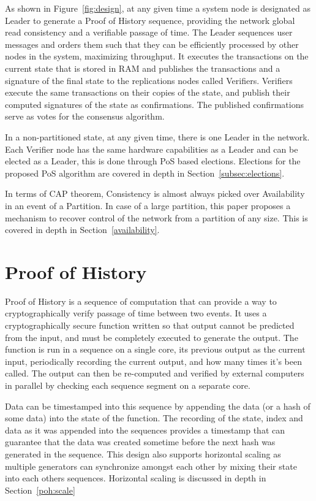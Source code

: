\documentclass[12pt]{article}
\begin{document}
As shown in Figure~\ref{fig:design}, at any given time a system node is designated as Leader to generate a Proof of History sequence, providing the network global read consistency and a verifiable passage of time. The Leader sequences user messages and orders them such that they can be efficiently processed by other nodes in the system, maximizing throughput. It executes the transactions on the current state that is stored in RAM and publishes the transactions and a signature of the final state to the replications nodes called Verifiers. Verifiers execute the same transactions on their copies of the state, and publish their computed signatures of the state as confirmations. The published confirmations serve as votes for the consensus algorithm.

In a non-partitioned state, at any given time, there is one Leader in the network. Each Verifier node has the same hardware capabilities as a Leader and can be elected as a Leader, this is done through PoS based elections. Elections for the proposed PoS algorithm are covered in depth in Section~\ref{subsec:elections}.

In terms of CAP theorem, Consistency is almost always picked over Availability in an event of a Partition. In case of a large partition, this paper proposes a mechanism to recover control of the network from a partition of any size. This is covered in depth in Section~\ref{availability}.

\section{Proof of History}\label{proof_of_history}

Proof of History is a sequence of computation that can provide a way to cryptographically verify passage of time between two events. It uses a cryptographically secure function written so that output cannot be predicted from the input, and must be completely executed to generate the output. The function is run in a sequence on a single core, its previous output as the current input, periodically recording the current output, and how many times it’s been called. The output can then be re-computed and verified by external computers in parallel by checking each sequence segment on a separate core.

Data can be timestamped into this sequence by appending the data (or a hash of some data) into the state of the function. The recording of the state, index and data as it was appended into the sequences provides a timestamp that can guarantee that the data was created sometime before the next hash was generated in the sequence. This design also supports horizontal scaling as multiple generators can synchronize amongst each other by mixing their state into each others sequences. Horizontal scaling is discussed in depth in Section~\ref{poh:scale}\\
\end{document}
